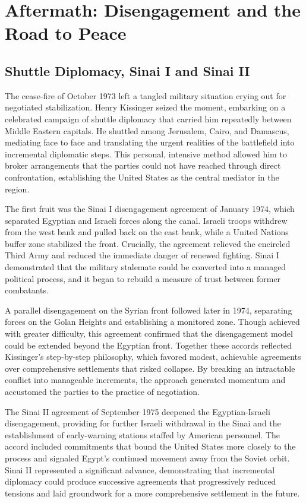 \section{Aftermath: Disengagement and the Road to Peace}

\subsection{Shuttle Diplomacy, Sinai I and Sinai II}
The cease-fire of October 1973 left a tangled military situation crying out for negotiated stabilization. Henry Kissinger seized the moment, embarking on a celebrated campaign of shuttle diplomacy that carried him repeatedly between Middle Eastern capitals. He shuttled among Jerusalem, Cairo, and Damascus, mediating face to face and translating the urgent realities of the battlefield into incremental diplomatic steps. This personal, intensive method allowed him to broker arrangements that the parties could not have reached through direct confrontation, establishing the United States as the central mediator in the region.

The first fruit was the Sinai I disengagement agreement of January 1974, which separated Egyptian and Israeli forces along the canal. Israeli troops withdrew from the west bank and pulled back on the east bank, while a United Nations buffer zone stabilized the front. Crucially, the agreement relieved the encircled Third Army and reduced the immediate danger of renewed fighting. Sinai I demonstrated that the military stalemate could be converted into a managed political process, and it began to rebuild a measure of trust between former combatants.

A parallel disengagement on the Syrian front followed later in 1974, separating forces on the Golan Heights and establishing a monitored zone. Though achieved with greater difficulty, this agreement confirmed that the disengagement model could be extended beyond the Egyptian front. Together these accords reflected Kissinger's step-by-step philosophy, which favored modest, achievable agreements over comprehensive settlements that risked collapse. By breaking an intractable conflict into manageable increments, the approach generated momentum and accustomed the parties to the practice of negotiation.

The Sinai II agreement of September 1975 deepened the Egyptian-Israeli disengagement, providing for further Israeli withdrawal in the Sinai and the establishment of early-warning stations staffed by American personnel. The accord included commitments that bound the United States more closely to the process and signaled Egypt's continued movement away from the Soviet orbit. Sinai II represented a significant advance, demonstrating that incremental diplomacy could produce successive agreements that progressively reduced tensions and laid groundwork for a more comprehensive settlement in the future.

